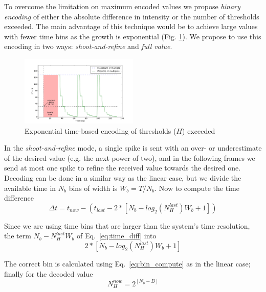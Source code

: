 \documentclass[twocolumn]{article}
\begin{document}
To overcome the limitation on maximum encoded values  we propose \textit{binary encoding} of either the absolute difference in intensity or the number of thresholds exceeded. The main advantage of this technique would be to achieve large values with fewer time bins as the growth is exponential (Fig. \ref{fig:exponential_time}). We propose to use this encoding in two ways: \textit{shoot-and-refine} and \textit{full value}. 

\begin{figure}[htb]
  \includegraphics[width=0.5\textwidth]{spike_values_exp}

  \caption{Exponential time-based encoding of thresholds ($H$) exceeded}
  \label{fig:exponential_time}
\end{figure} 

In the \textit{shoot-and-refine} mode, a single spike is sent with an over- or underestimate of the desired value (e.g. the next power of two), and in the following frames we send at most one spike to refine the received value towards the desired one. Decoding can be done in a similar way as the linear case, but we divide the available time in $N_{b}$ bins of width is $W_{b} = T/N_{b}$. Now to compute the time difference
\begin{equation}
\Delta t = t_{now} - \left( t_{last} - 2*\left[N_{b} - log_{2}(N_{H}^{last})W_{b} + 1\right] \right)
\label{eq:time_diff_exp}
\end{equation}

Since we are using time bins that are larger than the system's time resolution, the term $N_{b} - N_{H}^{last}W_{b}$ of Eq.~\ref{eq:time_diff} into
\begin{equation}
 2*\left[N_{b} - log_{2}(N_{H}^{last})W_{b} + 1\right]
\end{equation}

The correct bin is calculated using Eq.~\ref{eq:bin_compute} as in the linear case; finally for the decoded value
\begin{equation}
N_{H}^{now} = 2^{ \left\lfloor N_{b} - B \right\rfloor }
\label{eq:new_Nh_exp}
\end{equation}
\end{document}
